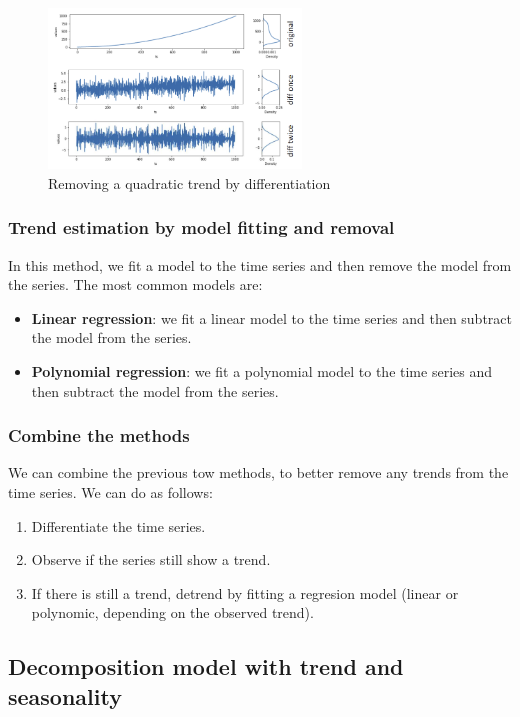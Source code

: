 \begin{figure}[H]
    \centering
    \includegraphics[width=0.6\textwidth]{figures/trend_by_diff.png}
    \caption{Removing a quadratic trend by differentiation}
    \label{fig:trend_by_diff}
\end{figure}

\subsubsection{Trend estimation by model fitting and removal}

In this method, we fit a model to the time series and then remove the model from the
series. The most common models are:
\begin{itemize}
    \item \textbf{Linear regression}: we fit a linear model to the time series and
    then subtract the model from the series.
    \item \textbf{Polynomial regression}: we fit a polynomial model to the time series
    and then subtract the model from the series.
\end{itemize}

\subsubsection{Combine the methods}

We can combine the previous tow methods, to better remove any trends from the time
series. We can do as follows:
\begin{enumerate}
    \item Differentiate the time series.
    \item Observe if the series still show a trend.
    \item If there is still a trend, detrend by fitting a regresion model (linear or
    polynomic, depending on the observed trend).
\end{enumerate}

\subsection{Decomposition model with trend and seasonality}

